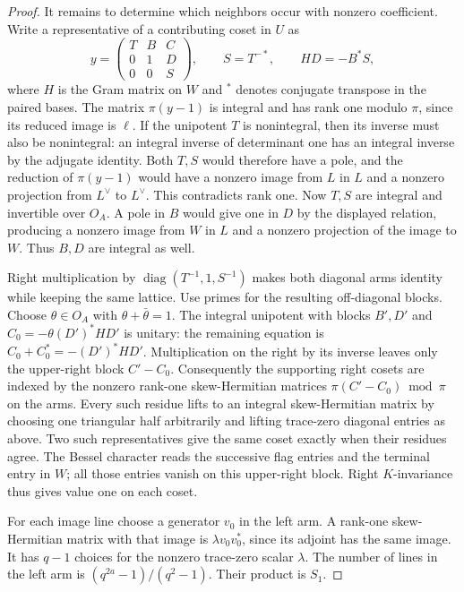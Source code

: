 \documentclass[a4paper,11pt]{article}
\theoremstyle{definition}
\theoremstyle{remark}
\numberwithin{equation}{section}
\begin{document}
\begin{proof}
It remains to determine which neighbors occur with nonzero
coefficient. Write a representative of a contributing coset
in \(U\) as
\[
 y=\begin{pmatrix}T&B&C\\0&1&D\\0&0&S\end{pmatrix},
              \qquad S=T^{-*},\qquad HD=-B^*S ,
\]
where \(H\) is the Gram matrix on \(W\) and \(^{*}\) denotes
conjugate transpose in the paired bases. The matrix
\(\pi(y-1)\) is integral and has rank one modulo \(\pi\),
since its reduced image is \(\ell\). If the unipotent \(T\)
is nonintegral, then its inverse must also be nonintegral:
an integral inverse of determinant one has an integral inverse
by the adjugate identity. Both \(T,S\) would therefore have a
pole, and the reduction of \(\pi(y-1)\) would have a nonzero
image from \(L\) in \(L\) and a nonzero projection from
\(L^\vee\) to \(L^\vee\). This contradicts rank one.
Now \(T,S\) are integral and invertible over \(O_A\). A pole
in \(B\) would give one in \(D\) by the displayed relation,
producing a nonzero image from \(W\) in \(L\) and a nonzero
projection of the image to \(W\). Thus \(B,D\) are integral
as well.

Right multiplication by \(\operatorname{diag}(T^{-1},1,S^{-1})\)
makes both diagonal arms identity while keeping the same
lattice. Use primes for the resulting off-diagonal blocks.
Choose \(\theta\in O_A\) with \(\theta+\bar\theta=1\).
The integral unipotent with blocks \(B',D'\) and
\(C_0=-\theta (D')^*HD'\) is unitary: the remaining equation
is \(C_0+C_0^*=-(D')^*HD'\). Multiplication on the right
by its inverse leaves only the upper-right block \(C'-C_0\).
Consequently the supporting right cosets are indexed by the
nonzero rank-one skew-Hermitian matrices
\(\pi(C'-C_0)\bmod\pi\) on the arms. Every such residue lifts
to an integral skew-Hermitian matrix by choosing one triangular
half arbitrarily and lifting trace-zero diagonal entries as above.
Two such representatives give the same coset exactly when
their residues agree. The Bessel character reads the successive
flag entries and the terminal entry in \(W\); all those entries
vanish on this upper-right block. Right \(K\)-invariance thus
gives value one on each coset.

For each image line choose a generator \(v_0\) in the left
arm. A rank-one skew-Hermitian matrix with that image is
\(\lambda v_0v_0^*\), since its adjoint has the same image.
It has \(q-1\) choices for the nonzero trace-zero scalar
\(\lambda\). The number of lines in the left arm is
\((q^{2a}-1)/(q^2-1)\). Their product is \(S_1\).
\end{proof}
\end{document}
